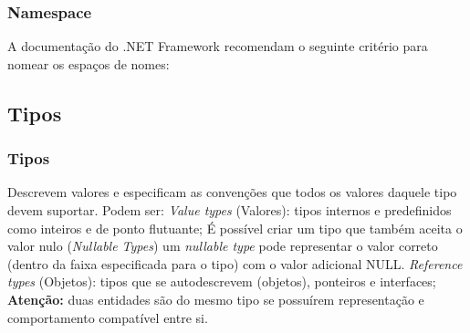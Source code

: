 \documentclass{beamer}
\begin{document}
\begin{frame}
\frametitle{Namespace}
\begin{outline}
	\1 [] A documentação do .NET Framework recomendam o seguinte critério para nomear os espaços de nomes:
	\2 [] \qquad [.<Caracteristica>][.<Subnamespace>]
	
\end{outline}



\end{frame}

\subsection{Tipos}
\begin{frame}
\frametitle{Tipos}
\begin{outline}
	\1 Descrevem valores e especificam as convenções que todos os valores daquele tipo devem suportar.
	\1 Podem ser:
	\2 \textit{Value types} (Valores): tipos internos e predefinidos como inteiros e de ponto flutuante;
		\3 É possível criar um tipo que também aceita o valor nulo (\textit{Nullable Types})
		\3 um \textit{nullable type} pode representar o valor correto (dentro da faixa especificada para o tipo) com o valor adicional NULL.
	\2 \textit{Reference types} (Objetos): tipos que se autodescrevem (objetos), ponteiros e interfaces;
	\1 \textbf{Atenção:} duas entidades são do mesmo tipo se possuírem representação e comportamento compatível entre si.

\end{outline}
\end{frame}
\end{document}
